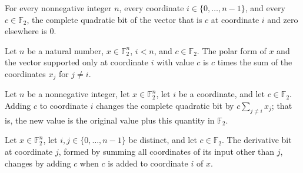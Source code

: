 \begin{theorem}
\label{FABL.completeQuadraticBit_single}
\leanok
{}
For every nonnegative integer $n$, every coordinate $i\in\{0,\ldots,n-1\}$, and every
$c\in\mathbb{F}_2$, the complete quadratic bit of the vector that is $c$ at coordinate
$i$ and zero elsewhere is $0$.
\end{theorem}

\begin{theorem}
\label{FABL.completeQuadraticPolar_single_right}
\leanok
{}
Let $n$ be a natural number, $x\in\mathbb F_2^n$, $i<n$, and $c\in\mathbb F_2$. The
polar form of $x$ and the vector supported only at coordinate $i$ with value $c$ is $c$
times the sum of the coordinates $x_j$ for $j\ne i$.
\end{theorem}

\begin{theorem}
\label{FABL.completeQuadraticBit_add_single}
\leanok
{}
Let $n$ be a nonnegative integer, let $x\in\mathbb{F}_2^n$, let $i$ be a coordinate, and
let $c\in\mathbb{F}_2$. Adding $c$ to coordinate $i$ changes the complete quadratic bit
by $c\sum_{j\ne i}x_j$; that is, the new value is the original value plus this quantity
in $\mathbb{F}_2$.
\end{theorem}

\begin{theorem}
\label{FABL.completeQuadraticDerivativeBit_add_single_of_ne}
\leanok
{}
Let $x\in\mathbb{F}_2^n$, let $i,j\in\{0,\ldots,n-1\}$ be distinct, and let
$c\in\mathbb{F}_2$. The derivative bit at coordinate $j$, formed by summing all
coordinates of its input other than $j$, changes by adding $c$ when $c$ is added to
coordinate $i$ of $x$.
\end{theorem}

